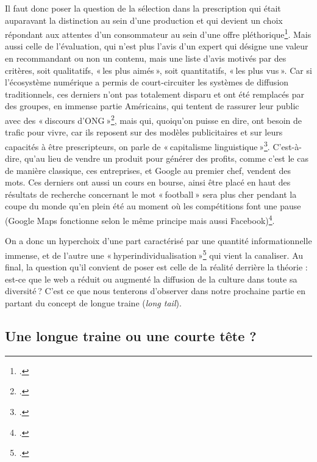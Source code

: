 Il faut donc poser la question de la sélection dans la prescription qui était auparavant la distinction au sein d’une production et qui devient un choix répondant aux attentes d’un consommateur au sein d’une offre pléthorique\footcite{ertzscheid2023}. Mais aussi celle de l’évaluation, qui n’est plus l’avis d’un expert qui désigne une valeur en recommandant ou non un contenu, mais une liste d’avis motivés par des critères, soit qualitatifs, « les plus aimés », soit quantitatifs, « les plus vus ». Car si l’écosystème numérique a permis de court-circuiter les systèmes de diffusion traditionnels, ces derniers n’ont pas totalement disparu et ont été remplacés par des groupes, en immense partie Américains, qui tentent de rassurer leur public avec des « discours d’ONG »\footcite[p. 3]{laugee__2013}, mais qui, quoiqu’on puisse en dire, ont besoin de trafic pour vivre, car ils reposent sur des modèles publicitaires et sur leurs capacités à être prescripteurs, on parle de « capitalisme linguistique »\footcite{kaplan_quand_2011}. C’est-à-dire, qu’au lieu de vendre un produit pour générer des profits, comme c’est le cas de manière classique, ces entreprises, et Google au premier chef, vendent des mots. Ces derniers ont aussi un cours en bourse, ainsi être placé en haut des résultats de recherche concernant le mot « football » sera plus cher pendant la coupe du monde qu’en plein été au moment où les compétitions font une pause (Google Maps fonctionne selon le même principe mais aussi Facebook)\footcite{kaplan_quand_2011}.

On a donc un hyperchoix d’une part caractérisé par une quantité informationnelle immense, et de l’autre une « hyperindividualisation »\footcite[p. 3]{laugee__2013} qui vient la canaliser. Au final, la question qu’il convient de poser est celle de la réalité derrière la théorie : est-ce que le web a réduit ou augmenté la diffusion de la culture dans toute sa diversité ? C’est ce que nous tenterons d’observer dans notre prochaine partie en partant du concept de longue traine (\textit{long tail}).

\subsection{Une longue traine ou une courte tête ?}

